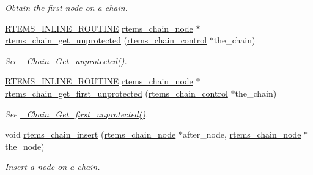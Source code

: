 \begin{DoxyCompactItemize}
\begin{DoxyCompactList}\small\item\em Obtain the first node on a chain. \end{DoxyCompactList}\item 
\mbox{\label{group__ClassicChains_ga247eca17e96d9c4b634ae3fb84184d80}} 
\mbox{\hyperlink{group__RTEMSScoreBaseDefs_gac216239df231d5dbd15e3520b0b9313f}{R\+T\+E\+M\+S\+\_\+\+I\+N\+L\+I\+N\+E\+\_\+\+R\+O\+U\+T\+I\+NE}} \mbox{\hyperlink{structChain__Node__struct}{rtems\+\_\+chain\+\_\+node}} $\ast$ \mbox{\hyperlink{group__ClassicChains_ga247eca17e96d9c4b634ae3fb84184d80}{rtems\+\_\+chain\+\_\+get\+\_\+unprotected}} (\mbox{\hyperlink{unionChain__Control}{rtems\+\_\+chain\+\_\+control}} $\ast$the\+\_\+chain)
\begin{DoxyCompactList}\small\item\em See \mbox{\hyperlink{group__RTEMSScoreChain_gac5bb79fd8e5b468790918a8e674a5d36}{\+\_\+\+Chain\+\_\+\+Get\+\_\+unprotected()}}. \end{DoxyCompactList}\item 
\mbox{\label{group__ClassicChains_ga4ddf636e0d8b4de874d66d01f991a75c}} 
\mbox{\hyperlink{group__RTEMSScoreBaseDefs_gac216239df231d5dbd15e3520b0b9313f}{R\+T\+E\+M\+S\+\_\+\+I\+N\+L\+I\+N\+E\+\_\+\+R\+O\+U\+T\+I\+NE}} \mbox{\hyperlink{structChain__Node__struct}{rtems\+\_\+chain\+\_\+node}} $\ast$ \mbox{\hyperlink{group__ClassicChains_ga4ddf636e0d8b4de874d66d01f991a75c}{rtems\+\_\+chain\+\_\+get\+\_\+first\+\_\+unprotected}} (\mbox{\hyperlink{unionChain__Control}{rtems\+\_\+chain\+\_\+control}} $\ast$the\+\_\+chain)
\begin{DoxyCompactList}\small\item\em See \mbox{\hyperlink{group__RTEMSScoreChain_ga1b1dedf23d978ddd9b30b0d1feb6e093}{\+\_\+\+Chain\+\_\+\+Get\+\_\+first\+\_\+unprotected()}}. \end{DoxyCompactList}\item 
void \mbox{\hyperlink{group__ClassicChains_ga2d55d75271c59d4eeb4ba0d61192b643}{rtems\+\_\+chain\+\_\+insert}} (\mbox{\hyperlink{structChain__Node__struct}{rtems\+\_\+chain\+\_\+node}} $\ast$after\+\_\+node, \mbox{\hyperlink{structChain__Node__struct}{rtems\+\_\+chain\+\_\+node}} $\ast$the\+\_\+node)
\begin{DoxyCompactList}\small\item\em Insert a node on a chain. \end{DoxyCompactList}\item 

\end{DoxyCompactItemize}
